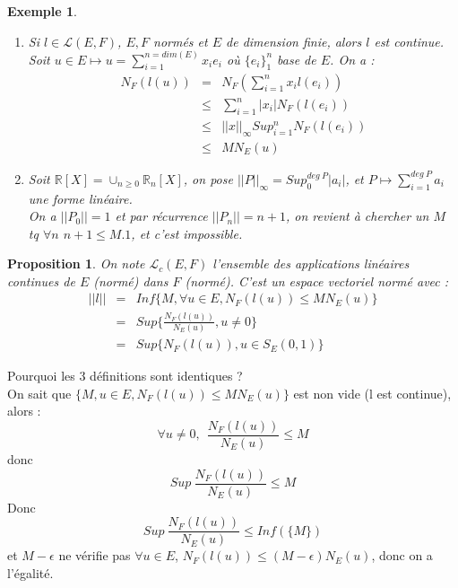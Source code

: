 \documentclass[a4paper, oneside]{report}
\theoremstyle{break}
\newtheorem{propo}[thm]{Proposition}
\newtheorem{exem}[thm]{Exemple}
\newcommand{\R}{\mathbb{R}}
\renewcommand{\L}{\mathcal{L}}
\newcommand{\evn}{espace vectoriel normé }
\newcommand{\aplins}{applications linéaires }
\begin{document}
\begin{exem}

\begin{enumerate}
\item Si $l\in \mathcal{L}(E,F)$, $E,F$ normés et $E$ de dimension finie, alors $l$ est continue.\\
Soit $u\in E\mapsto  u=\sum_{i=1}^{n=dim(E)}x_ie_i$ où $\{e_i\}^n_1$ base de $E$. On a :
$$\begin{array}{lll}
N_F(l(u))&=&N_F(\sum_{i=1}^{n}x_il(e_i))\\
&\leq & \sum_{i=1}^n |x_i| N_F(l(e_i))\\
&\leq & ||x||_\infty Sup_{i=1}^n N_F(l(e_i))\\
& \leq & M N_E(u)
\end{array}$$

\item Soit $\R[X]=\cup_{n\geq 0}\R_n[X]$, on pose $||P||_\infty = Sup_0^{deg~P}|a_i|$, et $P\mapsto \sum_{i=1}^{deg~P}a_i$ une forme linéaire.\\
On a $||P_0||=1$ et par récurrence $||P_n||=n+1$, on revient à chercher un $M$ tq $\forall n$ $n+1\leq M.1$, et c'est impossible.
\end{enumerate}
\end{exem}

\begin{propo}
On note $\L_c(E,F)$ l'ensemble des \aplins continues de $E$ (normé) dans $F$ (normé). C'est un \evn avec :
$$\begin{array}{lll}
||l||&=& Inf\{M, \forall u \in E, N_F(l(u))\leq M N_E(u) \}\\
&=& Sup\{\frac{N_F(l(u))}{N_E(u)}, u\neq 0 \}\\
&=& Sup\{N_F(l(u)), u \in S_E(0,1) \}
\end{array}$$
\end{propo}

Pourquoi les 3 définitions sont identiques ?\\
On sait que $\{M, u \in E, N_F(l(u))\leq M N_E(u) \}$ est non vide (l est continue), alors :
$$\forall u \neq 0,~~\frac{N_F(l(u))}{N_E(u)}\leq M$$
donc
$$Sup~\frac{N_F(l(u))}{N_E(u)}\leq M$$
Donc
$$Sup~\frac{N_F(l(u))}{N_E(u)}\leq Inf(\{M\})$$
et $M-\epsilon$ ne vérifie pas $\forall u \in E$, $N_F(l(u))\leq (M-\epsilon) N_E(u)$, donc on a l'égalité.
\end{document}

